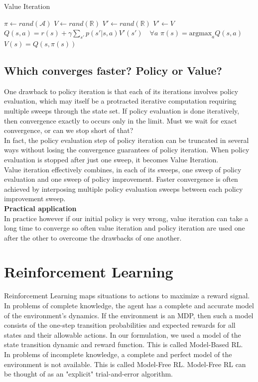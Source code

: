 \documentclass[11pt]{article}
\begin{document}
\begin{algorithm}
\caption{Value Iteration}\label{alg:cap}
\begin{algorithmic}[1]
\STATE $\pi \gets rand(\mathcal{A})$
\STATE $V \gets rand(\mathbb{R})$
\STATE $V' \gets rand(\mathbb{R})$
    \STATE $V' \gets V$
        \STATE $Q(s,a) = r(s) + \gamma \sum\limits_{s'} p(s'|s,a)V'(s') \quad \forall a$
        \STATE $\pi(s) = \text{argmax}_a Q(s,a)$
        \STATE $V(s) = Q(s,\pi(s))$
    \ENDFOR
\ENDWHILE\\
\end{algorithmic}
\end{algorithm}



\subsection{Which converges faster? Policy or Value?}
One drawback to policy iteration is that each of its iterations involves policy evaluation, which may itself be a protracted iterative computation requiring multiple sweeps through the state set. If policy evaluation is done iteratively, then convergence exactly to  occurs only in the limit. Must we wait for exact convergence, or can we stop short of that?\\
In fact, the policy evaluation step of policy iteration can be truncated in several ways without losing the convergence guarantees of policy iteration. When policy evaluation is stopped after just one sweep, it becomes Value Iteration.\\
Value iteration effectively combines, in each of its sweeps, one sweep of policy evaluation and one sweep of policy improvement. Faster convergence is often achieved by interposing multiple policy evaluation sweeps between each policy improvement sweep. \\

\textbf{Practical application} \\

In practice however if our initial policy is very wrong, value iteration can take a long time to converge so often value iteration and policy iteration are used one after the other to overcome the drawbacks of one another.


\section{Reinforcement Learning}
Reinforcement Learning maps situations
to actions to maximize a reward signal. In problems of complete knowledge, the agent has a complete and accurate model of the environment's dynamics. If the environment is an MDP, then such a model consists of the one-step transition probabilities and expected rewards for all states and their allowable actions. In our formulation, we used a model of the state transition dynamic and reward function. This is called Model-Based RL.\\
In problems of incomplete knowledge, a complete and perfect model of the environment is not available. This is called Model-Free RL. Model-Free RL can be thought of as an "explicit" trial-and-error algorithm.
\end{document}
